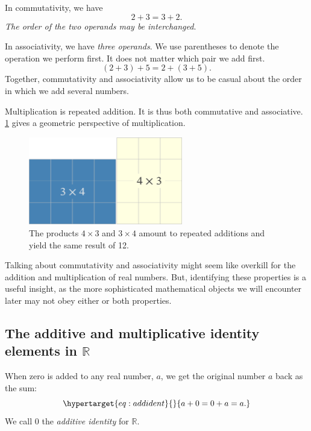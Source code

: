 \documentclass[
  a4paper,
]{article}
\begin{document}
In commutativity, we have \[
2 + 3 = 3 + 2.
\] \emph{The order of the two operands may be interchanged}.

In associativity, we have \emph{three operands}. We use parentheses to
denote the operation we perform first. It does not matter which pair we
add first. \[
(2 + 3) + 5 = 2 + (3 + 5).
\] Together, commutativity and associativity allow us to be casual about
the order in which we add several numbers.

Multiplication is repeated addition. It is thus both commutative and
associative. \cref{fig:mult} gives a geometric perspective of
multiplication.

\begin{figure}
\hypertarget{fig:mult}{%
\centering
\includegraphics[width=0.6\textwidth,height=\textheight]{images/four-by-three.png}
\caption{The products \(4\times3\) and \(3\times4\) amount to repeated
additions and yield the same result of 12.}\label{fig:mult}
}
\end{figure}

Talking about commutativity and associativity might seem like overkill
for the addition and multiplication of real numbers. But, identifying
these properties is a useful insight, as the more sophisticated
mathematical objects we will encounter later may not obey either or both
properties.

\hypertarget{the-additive-and-multiplicative-identity-elements-in-mathbbr}{%
\subsection{\texorpdfstring{The additive and multiplicative identity
elements in
\(\mathbb{R}\)}{The additive and multiplicative identity elements in \textbackslash mathbb\{R\}}}\label{the-additive-and-multiplicative-identity-elements-in-mathbbr}}

When zero is added to any real number, \(a\), we get the original number
\(a\) back as the sum:
\begin{equation}\protect\hypertarget{eq:addident}{}{
a + 0 = 0 + a = a.
}\label{eq:addident}\end{equation} We call \(0\) the \emph{additive
identity} for \(\mathbb{R}\).
\end{document}
